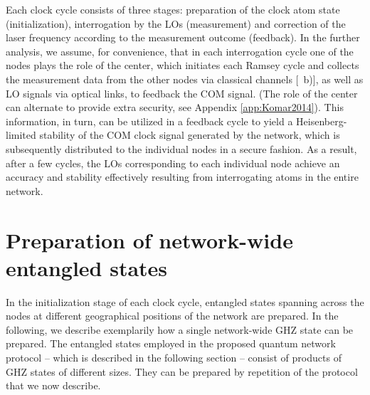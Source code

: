 Each clock cycle consists of three stages: preparation of the clock atom state
(initialization), interrogation by the LOs (measurement) and correction of the
laser frequency according to the measurement outcome (feedback).
In the further analysis, we assume, for convenience, that in each interrogation
cycle one of the nodes plays the role of the center, which initiates
each Ramsey cycle and collects the measurement data from the other nodes via
classical channels [~b)], as well as LO signals via optical links,
 to feedback the COM signal.
(The role of the center can alternate to provide extra security, see
 Appendix \ref{app:Komar2014}). This information, in turn, can be utilized in a
 feedback cycle to yield a Heisenberg-limited stability of the COM clock signal
 generated by the network, which is
subsequently distributed to the individual nodes in a secure fashion.  As a
result, after a few cycles, the LOs corresponding to each individual node
achieve an accuracy and stability effectively resulting from interrogating atoms
in the entire network.



\section{Preparation of network-wide entangled states}
\label{sec:NWES}

In the initialization stage of each clock cycle, entangled states spanning
across the nodes at different geographical positions of the network are
prepared. In the following, we describe exemplarily how a single network-wide
GHZ state can be prepared. 
The entangled states employed in the proposed quantum network protocol -- which
is described in the following section -- consist of products of GHZ states of
different sizes. They can be prepared by repetition of the protocol that
we now describe.


